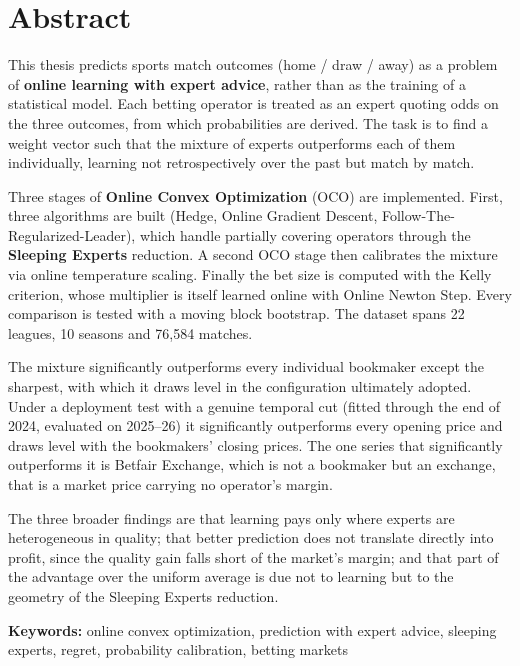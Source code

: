 \documentclass[12pt,a4paper,oneside]{report}
\renewcommand{\_}{\oldunderscore\allowbreak}
\theoremstyle{definition}
\theoremstyle{plain}
\theoremstyle{remark}
\begin{document}
\chapter*{Abstract}

This thesis predicts sports match outcomes (home / draw / away) as a problem of
\textbf{online learning with expert advice}, rather than as the training of a statistical
model. Each betting operator is treated as an expert quoting odds on the three outcomes,
from which probabilities are derived. The task is to find a weight vector such that the
mixture of experts outperforms each of them individually, learning not retrospectively over
the past but match by match.

Three stages of \textbf{Online Convex Optimization} (OCO) are implemented. First, three
algorithms are built (Hedge, Online Gradient Descent, Follow-The-Regularized-Leader), which
handle partially covering operators through the \textbf{Sleeping Experts} reduction. A second
OCO stage then calibrates the mixture via online temperature scaling. Finally the bet size is
computed with the Kelly criterion, whose multiplier is itself learned online with Online
Newton Step. Every comparison is tested with a moving block bootstrap. The dataset spans
22 leagues, 10 seasons and 76,584 matches.

The mixture significantly outperforms every individual bookmaker except the sharpest, with
which it draws level in the configuration ultimately adopted. Under a deployment test with a
genuine temporal cut (fitted through the end of 2024, evaluated on 2025--26) it significantly
outperforms every opening price and draws level with the bookmakers' closing prices. The one
series that significantly outperforms it is Betfair Exchange, which is not a bookmaker but an
exchange, that is a market price carrying no operator's margin.

The three broader findings are that learning pays only where experts are heterogeneous in
quality; that better prediction does not translate directly into profit, since the quality
gain falls short of the market's margin; and that part of the advantage over the uniform
average is due not to learning but to the geometry of the Sleeping Experts reduction.

\vspace{1em}
\noindent\textbf{Keywords:} online convex optimization, prediction with expert advice,
sleeping experts, regret, probability calibration, betting markets
\end{document}
